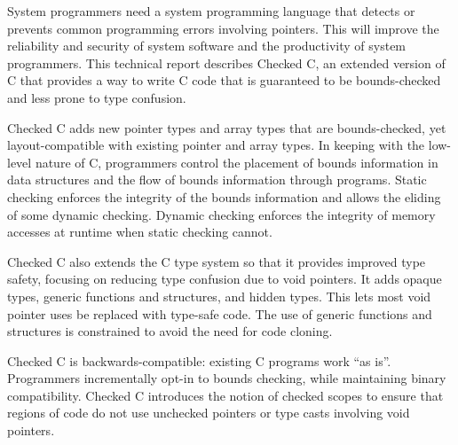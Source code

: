 
\parbox{5.5in}{
System programmers need a system programming language that
detects or prevents common programming errors involving pointers. This
will improve the reliability and security of system software and
the productivity of system programmers. This technical report describes
Checked C, an extended version of C that provides a way to write C code that
is guaranteed to be bounds-checked and less prone to type confusion.
}

\vspace{11pt}

\parbox{5.5in}{
Checked C adds new pointer types and array types that are
bounds-checked, yet layout-compatible with existing pointer and array
types. In keeping with the low-level nature of C, 
programmers control the placement of bounds information in data
structures and the flow of bounds information through programs. Static
checking enforces the integrity of the bounds information and allows the
eliding of some dynamic checking. Dynamic checking enforces the
integrity of memory accesses at runtime when static checking cannot.
}

\vspace{11pt}

\parbox{5.5in}{
Checked C also extends the C type system so that it provides
improved type safety, focusing on reducing type
confusion due to void pointers.  It adds opaque types, generic
functions and structures, and hidden types.  This lets
most void pointer uses be replaced with type-safe code.
The use of generic functions and structures is constrained to avoid 
the need for code cloning.
}

\vspace{11pt}

\parbox{5.5in}{
Checked C is backwards-compatible: existing C programs work
``as is''. Programmers incrementally opt-in to bounds checking, while
maintaining binary compatibility.
Checked C introduces the notion of checked scopes to ensure
that regions of code do not use unchecked pointers or type casts
involving void pointers.
}


